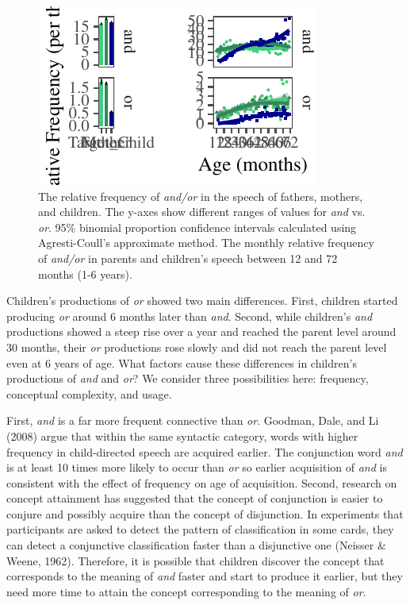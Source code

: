 \documentclass[,man,floatsintext]{apa6}
\begin{document}
\begin{figure}[tb]

{\centering \includegraphics{figs/bySpeakerAgePlots-1} 

}

\caption{The relative frequency of \textit{and/or} in the speech of fathers, mothers, and children. The y-axes show different ranges of values for \textit{and} vs. \textit{or}. 95\% binomial proportion confidence intervals calculated using Agresti-Coull's approximate method. The monthly relative frequency of \textit{and/or} in parents and children's speech between 12 and 72 months (1-6 years).}\label{fig:bySpeakerAgePlots}
\end{figure}

Children's productions of \emph{or} showed two main differences. First, children started producing \emph{or} around 6 months later than \emph{and}. Second, while children's \emph{and} productions showed a steep rise over a year and reached the parent level around 30 months, their \emph{or} productions rose slowly and did not reach the parent level even at 6 years of age. What factors cause these differences in children's productions of \emph{and} and \emph{or}? We consider three possibilities here: frequency, conceptual complexity, and usage.

First, \emph{and} is a far more frequent connective than \emph{or}. Goodman, Dale, and Li (2008) argue that within the same syntactic category, words with higher frequency in child-directed speech are acquired earlier. The conjunction word \emph{and} is at least 10 times more likely to occur than \emph{or} so earlier acquisition of \emph{and} is consistent with the effect of frequency on age of acquisition. Second, research on concept attainment has suggested that the concept of conjunction is easier to conjure and possibly acquire than the concept of disjunction. In experiments that participants are asked to detect the pattern of classification in some cards, they can detect a conjunctive classification faster than a disjunctive one (Neisser \& Weene, 1962). Therefore, it is possible that children discover the concept that corresponds to the meaning of \emph{and} faster and start to produce it earlier, but they need more time to attain the concept corresponding to the meaning of \emph{or}.
\end{document}
